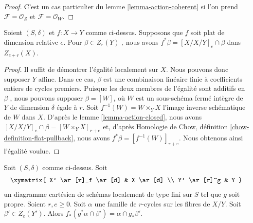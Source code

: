 \begin{proof} 
C'est un cas particulier du lemme \ref{lemma-action-coherent} si
 l'on prend $\mathcal{F} = \mathcal{O}_Z$ et $\mathcal{F} = \mathcal{O}_W$. 
\end{proof} 

\begin{lemma} 
\label{lemma-flat-pullback-as-action} 
Soient $(S, \delta)$ et $f : X \to Y$ comme ci-dessus. Supposons que 
$f$ soit plat de dimension relative $e$. Pour $\beta \in Z_r(Y)$
 , nous avons $f^*\beta = [X/X/Y]_e \cap \beta$ dans $Z_{e + r}(X)$. 
\end{lemma} 

\begin{proof} 
Il suffit de démontrer l'égalité localement sur $X$. Nous pouvons donc supposer 
$Y$ affine. Dans ce cas, $\beta$ est une combinaison linéaire finie à coefficients
 entiers de cycles premiers. Puisque les deux membres de l'égalité sont additifs en $\beta$
 , nous pouvons supposer $\beta = [W]$, où $W$ est un sous-schéma fermé intègre de 
$Y$ de dimension $\delta$ égale à $r$. Soit $f^{-1}(W) = W \times_Y X$ l'image
 inverse schématique de $W$ dans $X$. D'après
 le lemme \ref{lemma-action-closed}, nous avons 
$[X/X/Y]_e \cap \beta = [W \times_Y X]_{r + e}$ et, d'après
 Homologie de Chow, définition \ref{chow-definition-flat-pullback}, 
nous avons $f^*\beta = [f^{-1}(W)]_{r + e}$. Nous obtenons ainsi l'égalité
 voulue. 
\end{proof} 

\begin{lemma} 
\label{lemma-action-push-pull} 
Soit $(S, \delta)$ comme ci-dessus. Soit 
$$
\xymatrix{
X' \ar[r]_f \ar[d] & X \ar[d] \\
Y' \ar[r]^g & Y
}
$$
 un diagramme cartésien de schémas localement de type fini sur $S$
 tel que $g$ soit propre. Soient $r, e \geq 0$. Soit $\alpha$ une famille de 
$r$-cycles sur les fibres de $X/Y$. Soit $\beta' \in Z_e(Y')$.
 Alors $f_*(g^*\alpha \cap \beta') = \alpha \cap g_*\beta'$. 
\end{lemma} 

